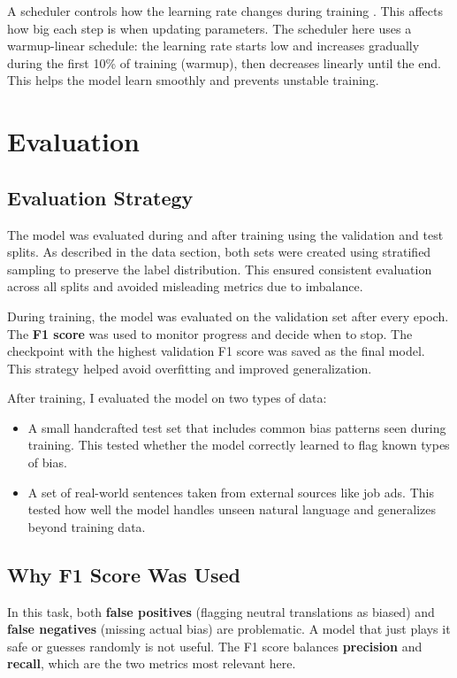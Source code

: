     A scheduler controls how the learning rate changes during training \citep{mosbachStabilityFinetuningBERT2021}. This affects how big each step is when updating parameters. The scheduler here uses a warmup-linear schedule: the learning rate starts low and increases gradually during the first 10\% of training (warmup), then decreases linearly until the end. This helps the model learn smoothly and prevents unstable training.

\section{Evaluation}
\subsection{Evaluation Strategy}

The model was evaluated during and after training using the validation and test splits. As described in the data section, both sets were created using stratified sampling to preserve the label distribution. This ensured consistent evaluation across all splits and avoided misleading metrics due to imbalance.

During training, the model was evaluated on the validation set after every epoch. The \textbf{F1 score} was used to monitor progress and decide when to stop. The checkpoint with the highest validation F1 score was saved as the final model. This strategy helped avoid overfitting and improved generalization.

After training, I evaluated the model on two types of data:
\begin{itemize}
    \item A small handcrafted test set that includes common bias patterns seen during training. This tested whether the model correctly learned to flag known types of bias.
    \item A set of real-world sentences taken from external sources like job ads. This tested how well the model handles unseen natural language and generalizes beyond training data.
\end{itemize}

\subsection{Why F1 Score Was Used}

In this task, both \textbf{false positives} (flagging neutral translations as biased) and \textbf{false negatives} (missing actual bias) are problematic. A model that just plays it safe or guesses randomly is not useful. The F1 score balances \textbf{precision} and \textbf{recall}, which are the two metrics most relevant here.

